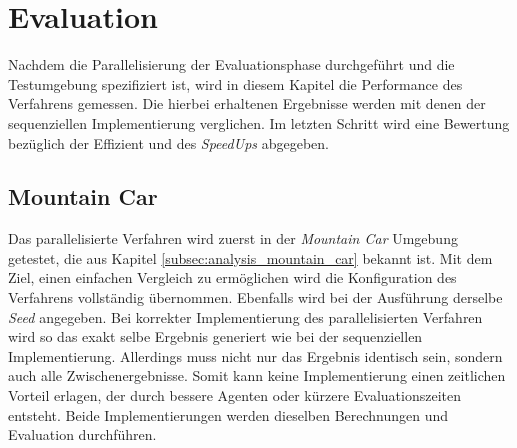 \section{Evaluation}
Nachdem die Parallelisierung der Evaluationsphase durchgeführt und die Testumgebung spezifiziert ist, wird in diesem Kapitel die Performance des Verfahrens gemessen. Die hierbei erhaltenen Ergebnisse werden mit denen der sequenziellen Implementierung verglichen. Im letzten Schritt wird eine Bewertung bezüglich der Effizient und des \emph{SpeedUps} abgegeben.

\subsection{Mountain Car}
Das parallelisierte Verfahren wird zuerst in der \emph{Mountain Car} Umgebung getestet, die aus Kapitel \ref{subsec:analysis_mountain_car} bekannt ist. Mit dem Ziel, einen einfachen Vergleich zu ermöglichen wird die Konfiguration des Verfahrens vollständig übernommen. Ebenfalls wird bei der Ausführung derselbe \emph{Seed} angegeben. Bei korrekter Implementierung des parallelisierten Verfahren wird so das exakt selbe Ergebnis generiert wie bei der sequenziellen Implementierung. Allerdings muss nicht nur das Ergebnis identisch sein, sondern auch alle Zwischenergebnisse. Somit kann keine Implementierung einen zeitlichen Vorteil erlagen, der durch bessere Agenten oder kürzere Evaluationszeiten entsteht. Beide Implementierungen werden dieselben Berechnungen und Evaluation durchführen.
